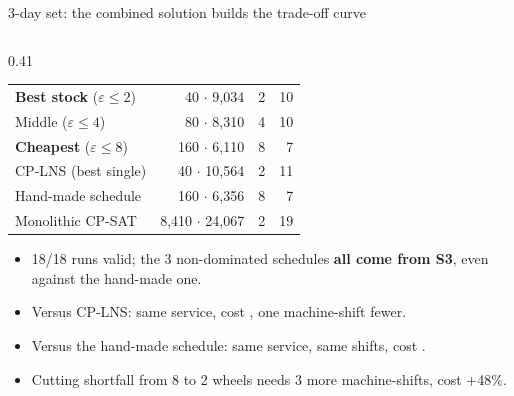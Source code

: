 \begin{frame}{3-day set: the combined solution builds the trade-off curve}
\begin{columns}[T]
\begin{column}{0.41\textwidth}
\begin{tabular}{@{}lrrr@{}}
\midrule
\textbf{Best stock} ($\varepsilon\le2$) & 40 $\cdot$ 9,034 & 2 & 10\\
Middle ($\varepsilon\le4$) & 80 $\cdot$ 8,310 & 4 & 10\\
\textbf{Cheapest} ($\varepsilon\le8$) & 160 $\cdot$ 6,110 & 8 & 7\\
\midrule
CP-LNS (best single) & 40 $\cdot$ 10,564 & 2 & 11\\
Hand-made schedule & 160 $\cdot$ 6,356 & 8 & 7\\
Monolithic CP-SAT & 8,410 $\cdot$ 24,067 & 2 & 19\\
\bottomrule
\end{tabular}
\vspace{0.4em}
\scriptsize
\begin{itemize}\setlength{\itemsep}{0.15em}
  \item 18/18 runs valid; the 3 non-dominated schedules \textbf{all come from S3}, even against the hand-made one.
  \item Versus CP-LNS: same service, cost , one machine-shift fewer.
  \item Versus the hand-made schedule: same service, same shifts, cost .
  \item Cutting shortfall from 8 to 2 wheels needs 3 more machine-shifts, cost +48\%.
\end{itemize}
\end{column}
\end{columns}
\end{frame}

